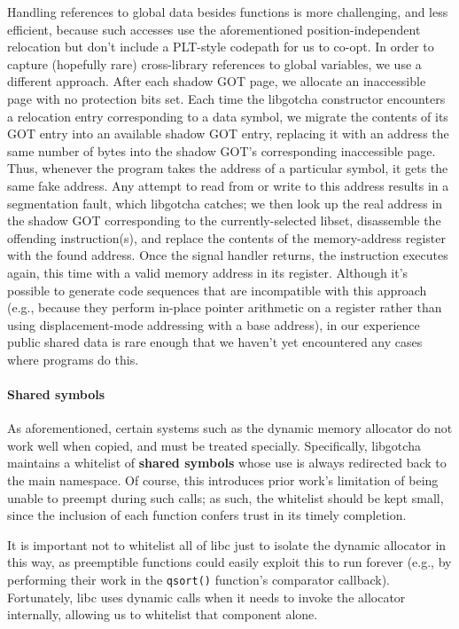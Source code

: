 Handling references to global data besides functions is more challenging, and less
efficient, because such accesses use the aforementioned position-independent
relocation but don't include a PLT-style codepath for us to co-opt.
In order to capture (hopefully rare) cross-library references to global variables,
we use a different approach.  After each shadow GOT page, we allocate an inaccessible
page with no protection bits set.  Each time the libgotcha constructor encounters a
relocation entry corresponding to a data symbol, we migrate the contents of its GOT
entry into an available shadow GOT entry, replacing it with an address the same
number of bytes into the shadow GOT's corresponding inaccessible page.  Thus,
whenever the program takes the address of a particular symbol, it gets the same fake
address.  Any attempt to read from or write to this address results in a segmentation
fault, which libgotcha catches; we then look up the real address in the shadow GOT
corresponding to the currently-selected libset, disassemble the offending
instruction(s), and replace the contents of the memory-address register with the
found address.  Once the signal handler returns, the instruction executes again, this
time with a valid memory address in its register.  Although it's possible to generate
code sequences that are incompatible with this approach (e.g., because they perform
in-place pointer arithmetic on a register rather than using displacement-mode
addressing with a base address), in our experience public shared data is rare enough
that we haven't yet encountered any cases where programs do this.

\paragraph{Shared symbols}

As aforementioned, certain systems such as the dynamic memory allocator do not work
well when copied, and must be treated specially.  Specifically, libgotcha maintains
a whitelist of \textbf{shared symbols} whose use is always redirected back to the
main namespace.  Of course, this introduces prior work's limitation of being unable
to preempt during such calls; as such, the whitelist should be kept small, since the
inclusion of each function confers trust in its timely completion.

It is important not to whitelist all of libc just to isolate the dynamic allocator in
this way, as preemptible functions could easily exploit this to run forever (e.g., by
performing their work in the \texttt{qsort()} function's comparator callback).
Fortunately, libc uses dynamic calls when it needs to invoke the allocator
internally, allowing us to whitelist that component alone.

